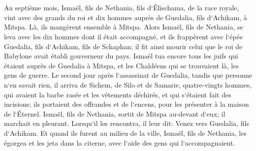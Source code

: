 \chapter{}

\verse Au septième mois, Ismaël, fils de Nethania, fils d`Élischama, de la race royale, vint avec des grands du roi et dix hommes auprès de Guedalia, fils d`Achikam, à Mitspa. Là, ils mangèrent ensemble à Mitspa. 
\verse Alors Ismaël, fils de Nethania, se leva avec les dix hommes dont il était accompagné, et ils frappèrent avec l`épée Guedalia, fils d`Achikam, fils de Schaphan; il fit ainsi mourir celui que le roi de Babylone avait établi gouverneur du pays. 
\verse Ismaël tua encore tous les juifs qui étaient auprès de Guedalia à Mitspa, et les Chaldéens qui se trouvaient là, les gens de guerre. 
\verse Le second jour après l`assassinat de Guedalia, tandis que personne n`en savait rien, 
\verse il arriva de Sichem, de Silo et de Samarie, quatre-vingts hommes, qui avaient la barbe rasée et les vêtements déchirés, et qui s`étaient fait des incisions; ils portaient des offrandes et de l`encens, pour les présenter à la maison de l`Éternel. 
\verse Ismaël, fils de Nethania, sortit de Mitspa au-devant d`eux; il marchait en pleurant. Lorsqu`il les rencontra, il leur dit: Venez vers Guedalia, fils d`Achikam. 
\verse Et quand ils furent au milieu de la ville, Ismaël, fils de Nethania, les égorgea et les jeta dans la citerne, avec l`aide des gens qui l`accompagnaient. 
